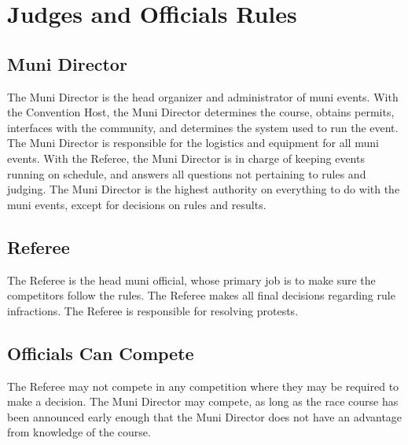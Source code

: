 \chapter{Judges and Officials Rules}

\section{Muni Director}

The Muni Director is the head organizer and administrator of muni events.
With the Convention Host, the Muni Director determines the course, obtains permits, interfaces with the community, and determines the system used to run the event.
The Muni Director is responsible for the logistics and equipment for all muni events.
With the Referee, the Muni Director is in charge of keeping events running on schedule, and answers all questions not pertaining to rules and judging.
The Muni Director is the highest authority on everything to do with the muni events, except for decisions on rules and results.

\section{Referee}

The Referee is the head muni official, whose primary job is to make sure the competitors follow the rules.
The Referee makes all final decisions regarding rule infractions.
The Referee is responsible for resolving protests.

\section{Officials Can Compete}

The Referee may not compete in any competition where they may be required to make a decision.
The Muni Director may compete, as long as the race course has been announced early enough that the Muni Director does not have an advantage from knowledge of the course.

